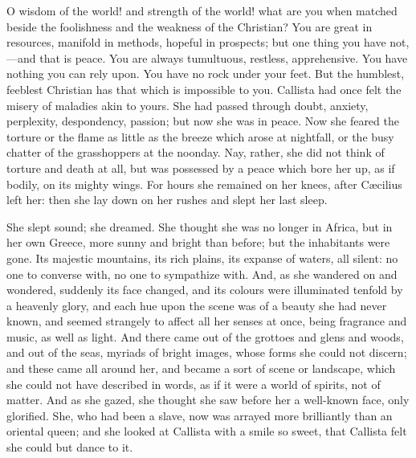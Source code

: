 O wisdom of the world! and strength of the world! what are you when
matched beside the foolishness and the weakness of the Christian? You
are great in resources, manifold in methods, hopeful in prospects; but
one thing you have not,—and that is peace. You are always
tumultuous, restless, apprehensive. You have nothing you can rely
upon. You have no rock under your feet. But the humblest, feeblest
Christian has that which is impossible to you. Callista had once
felt the misery of maladies akin to yours. She had passed through
doubt, anxiety, perplexity, despondency, passion; but now she was in
peace. Now she feared the torture or the flame as little as the breeze
which arose at nightfall, or the busy chatter of the grasshoppers at
the noonday. Nay, rather, she did not think of torture and death at
all, but was possessed by a peace which bore her up, as if bodily, on
its mighty wings. For hours she remained on her knees, after Cæcilius
left her: then she lay down on her rushes and slept her last sleep.

She slept sound; she dreamed. She thought she was no longer in
Africa, but in her own Greece, more sunny and bright than before; but
the inhabitants were gone. Its majestic mountains, its rich plains,
its expanse of waters, all silent: no one to converse with, no one to
sympathize with. And, as she wandered on and wondered, suddenly its
face changed, and its colours were illuminated tenfold by a heavenly
glory, and each hue upon the scene was of a beauty she had never
known, and seemed strangely to affect all her senses at once, being
fragrance and music, as well as light. And there came out of the
grottoes and glens and woods, and out of the seas, myriads of bright
images, whose forms she could not discern; and these came all around
her, and became a sort of scene or landscape, which she could not have
described in words, as if it were a world of spirits, not of matter.
And as she gazed, she thought she saw before her a well-known
face, only glorified. She, who had been a slave, now was arrayed more
brilliantly than an oriental queen; and she looked at Callista with a
smile so sweet, that Callista felt she could but dance to it.

